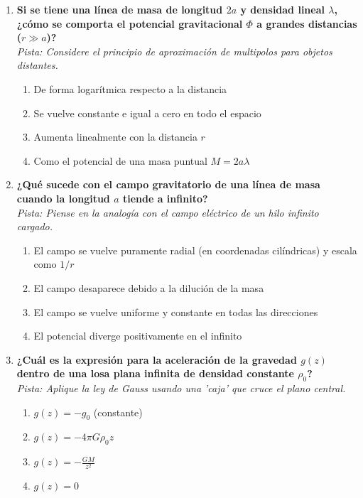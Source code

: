 \documentclass[12pt,a4paper]{article}
\begin{document}
\begin{enumerate}[label=\textbf{\arabic*.}, itemsep=1.5em]
\item \textbf{Si se tiene una línea de masa de longitud $2a$ y densidad lineal $\lambda$, ¿cómo se comporta el potencial gravitacional $\Phi$ a grandes distancias ($r \gg a$)?} \\
\textit{Pista: Considere el principio de aproximación de multipolos para objetos distantes.}
\begin{enumerate}[label=\alph*), leftmargin=*]
    \item De forma logarítmica respecto a la distancia
    \item Se vuelve constante e igual a cero en todo el espacio
    \item Aumenta linealmente con la distancia $r$
    \item Como el potencial de una masa puntual $M = 2a\lambda$
\end{enumerate}

\item \textbf{¿Qué sucede con el campo gravitatorio de una línea de masa cuando la longitud $a$ tiende a infinito?} \\
\textit{Pista: Piense en la analogía con el campo eléctrico de un hilo infinito cargado.}
\begin{enumerate}[label=\alph*), leftmargin=*]
    \item El campo se vuelve puramente radial (en coordenadas cilíndricas) y escala como $1/r$
    \item El campo desaparece debido a la dilución de la masa
    \item El campo se vuelve uniforme y constante en todas las direcciones
    \item El potencial diverge positivamente en el infinito
\end{enumerate}

\item \textbf{¿Cuál es la expresión para la aceleración de la gravedad $g(z)$ dentro de una losa plana infinita de densidad constante $\rho_0$?} \\
\textit{Pista: Aplique la ley de Gauss usando una 'caja' que cruce el plano central.}
\begin{enumerate}[label=\alph*), leftmargin=*]
    \item $g(z) = -g_0$ (constante)
    \item $g(z) = -4\pi G \rho_0 z$
    \item $g(z) = -\frac{GM}{z^2}$
    \item $g(z) = 0$
\end{enumerate}


\end{enumerate}
\end{document}
